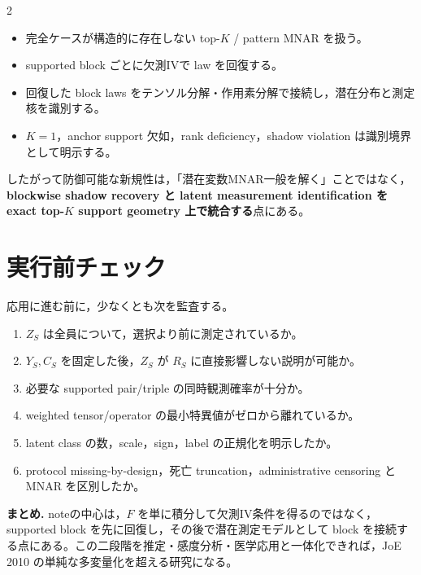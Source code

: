 \documentclass[a4paper,10pt]{article}
\begin{document}
\begin{multicols}{2}
\begin{itemize}[leftmargin=1.4em,itemsep=0pt,topsep=0pt]
\item 完全ケースが構造的に存在しない top-\(K\) / pattern MNAR を扱う。
\item supported block ごとに欠測IVで law を回復する。
\item 回復した block laws をテンソル分解・作用素分解で接続し，潜在分布と測定核を識別する。
\item \(K=1\)，anchor support 欠如，rank deficiency，shadow violation は識別境界として明示する。
\end{itemize}

したがって防御可能な新規性は，「潜在変数MNAR一般を解く」ことではなく，\textbf{blockwise shadow recovery と latent measurement identification を exact top-\(K\) support geometry 上で統合する}点にある。

\section{実行前チェック}
応用に進む前に，少なくとも次を監査する。
\begin{enumerate}[label=\arabic*.,leftmargin=1.6em,itemsep=0pt,topsep=0pt]
\item \(Z_S\) は全員について，選択より前に測定されているか。
\item \(Y_S,C_S\) を固定した後，\(Z_S\) が \(R_S\) に直接影響しない説明が可能か。
\item 必要な supported pair/triple の同時観測確率が十分か。
\item weighted tensor/operator の最小特異値がゼロから離れているか。
\item latent class の数，scale，sign，label の正規化を明示したか。
\item protocol missing-by-design，死亡 truncation，administrative censoring と MNAR を区別したか。
\end{enumerate}

\vspace{0.3mm}
\noindent\textbf{まとめ.}
noteの中心は，\(F\) を単に積分して欠測IV条件を得るのではなく，supported block を先に回復し，その後で潜在測定モデルとして block を接続する点にある。この二段階を推定・感度分析・医学応用と一体化できれば，JoE 2010 の単純な多変量化を超える研究になる。

\vspace{0.2mm}

\end{multicols}
\end{document}
